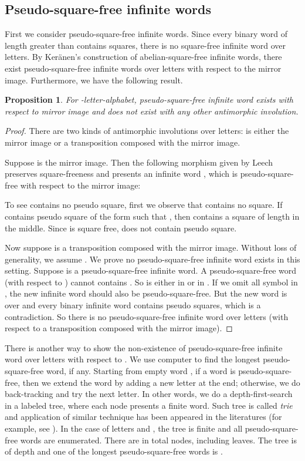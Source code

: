 \documentclass[12pt]{article}
\newtheorem{proposition}[theorem]{Proposition}
\begin{document}
\subsection{Pseudo-square-free infinite words}
First we consider pseudo-square-free infinite words. Since every
binary word of length greater than  contains squares, there is no
square-free infinite word over  letters. By Ker\"anen's
construction of abelian-square-free infinite words, there exist
pseudo-square-free infinite words over  letters with respect to
the mirror image. Furthermore, we have the following result.


\begin{proposition}\label{prop:pseudoleech}
For -letter-alphabet, pseudo-square-free infinite word exists
with respect to mirror image and does not exist with any other
antimorphic involution.
\end{proposition}
\begin{proof}
There are two kinds of antimorphic involutions over  letters:
 is either the mirror image or a transposition composed with
the mirror image.

Suppose  is the mirror image. Then the following morphism
 given by Leech \cite{Leech1957} preserves square-freeness and
presents an infinite word , which is
pseudo-square-free with respect to the mirror image:

To see  contains no pseudo square, first we
observe that  contains no square. If  contains pseudo square
of the form  such that , then
 contains a square of length  in the middle.
Since  is square free,  does not contain pseudo square.

Now suppose  is a transposition composed with the mirror
image. Without loss of generality, we assume
. We prove no pseudo-square-free
infinite word exists in this setting. Suppose  is a
pseudo-square-free infinite word. A pseudo-square-free word (with
respect to ) cannot contains . So  is either in
 or in
. If we omit all symbol  in
, the new infinite word should also be pseudo-square-free. But
the new word is over  and every binary infinite
word contains pseudo squares, which is a contradiction. So there is
no pseudo-square-free infinite word over  letters (with respect
to a transposition composed with the mirror image).
\end{proof}


There is another way to show the non-existence of pseudo-square-free
infinite word over  letters with respect to . We
use computer to find the longest pseudo-square-free word, if any.
Starting from empty word , if a word is
pseudo-square-free, then we extend the word by adding a new letter
 at the end; otherwise, we do back-tracking and try the next
letter. In other words, we do a depth-first-search in a labeled
tree, where each node presents a finite word. Such tree is called
\emph{trie} and application of similar technique has been appeared
in the literatures (for example, see \cite{Shallit2004}). In the
case of  letters and , the tree
is finite and all pseudo-square-free words are enumerated. There are
in total  nodes, including  leaves. The tree is of depth 
and one of the longest pseudo-square-free words is
.
\end{document}
